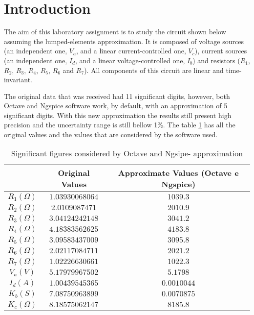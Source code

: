 \section{Introduction}
\label{sec:introduction}

\par
The aim of this laboratory assignment is to study the circuit shown below assuming the lumped-elements approximation. It is composed of voltage sources (an independent one, $V_a$, and a linear current-controlled one, $V_c$), current sources (an independent one, $I_d$, and a linear voltage-controlled one, $I_b$) and resistors ($R_1$, $R_2$, $R_3$, $R_4$, $R_5$, $R_6$ and $R_7$). All components of this circuit are linear and time-invariant.

The original data that was received had 11 significant digits, however, both Octave and Ngspice software work, by default, with an approximation of 5 significant digits. With this new approximation the results still present high precision and the uncertainty range is still bellow 1\%. The table \ref{tab:ap} has all the original values and the values that are considered by the software used. 


\begin{table}[hbt!]
\centering
\begin{tabular}{||c|c|c||}
\hline
        &           Original Values         & Approximate Values (Octave e Ngspice) \\ \hline
 $R_1 (\Omega)$   &  $   1.03930068064   $     & $1039.3$\\ \hline
 $R_2 (\Omega)$   &  $   2.0109087471    $      & $2010.9$\\ \hline
 $R_3 (\Omega)$   &  $   3.04124242148   $    & $3041.2$\\ \hline
 $R_4 (\Omega)$   &  $   4.18383562625   $     & $4183.8$\\ \hline
 $R_5 (\Omega)$   &  $   3.09583437009   $     & $3095.8$\\ \hline
 $R_6 (\Omega)$   &  $   2.02117084711   $     & $2021.2$\\ \hline
 $R_7 (\Omega)$   &  $   1.02226630661   $     & $1022.3$\\\hline
 $V_a (V)$   &  $   5.17979967502   $     & $5.1798$\\ \hline
 $I_d (A)$   &  $    1.00439545365     $     & $0.0010044$\\ \hline
 $K_b (S)$   &  $    7.08750963899     $     & $0.0070875$\\ \hline
 $K_c (\Omega)$   &     $8.18575062147    $     & $8185.8$\\ \hline
\end{tabular}
\caption{Significant figures considered by Octave and Ngsipe- approximation} 
\label{tab:ap}
\end{table}


